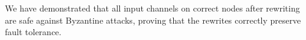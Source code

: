 We have demonstrated that all input channels on correct nodes after rewriting are safe against Byzantine attacks, proving that the rewrites correctly preserve fault tolerance.








